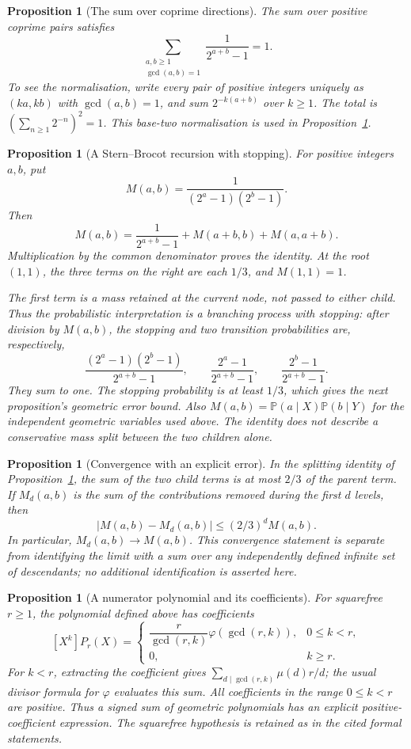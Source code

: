 \documentclass[11pt]{article}
\theoremstyle{plain}
\newtheorem{prop}[thm]{Proposition}
\theoremstyle{definition}
\theoremstyle{remark}
\begin{document}
\begin{prop}[The sum over coprime directions]\label{catalogue:mob:a8}
The sum over positive coprime pairs satisfies
\[
 \sum_{\substack{a,b\ge1\\\gcd(a,b)=1}}
                  \frac1{2^{a+b}-1}=1.
\]
To see the normalisation, write every pair of positive integers uniquely
as $(ka,kb)$ with $\gcd(a,b)=1$, and sum $2^{-k(a+b)}$ over $k\ge1$.
The total is $(\sum_{n\ge1}2^{-n})^2=1$. This base-two normalisation
is used in Proposition~\ref{catalogue:mob:a9a}.
\end{prop}

\begin{prop}[A Stern--Brocot recursion with stopping]\label{catalogue:mob:a9a}
For positive integers $a,b$, put
\[
 M(a,b)=\frac1{(2^a-1)(2^b-1)}.
\]
Then
\[
 M(a,b)=\frac1{2^{a+b}-1}+M(a+b,b)+M(a,a+b).
\]
Multiplication by the common denominator proves the identity. At the
root $(1,1)$, the three terms on the right are each $1/3$, and
$M(1,1)=1$.

The first term is a mass retained at the current node, not passed to
either child. Thus the probabilistic interpretation is a branching
process with stopping: after division by $M(a,b)$, the stopping and two
transition probabilities are, respectively,
\[
 \frac{(2^a-1)(2^b-1)}{2^{a+b}-1},\qquad
 \frac{2^a-1}{2^{a+b}-1},\qquad
 \frac{2^b-1}{2^{a+b}-1}.
\]
They sum to one. The stopping probability is at least $1/3$, which gives
the next proposition's geometric error bound. Also
$M(a,b)=\mathbb P(a\mid X)\mathbb P(b\mid Y)$ for the independent
geometric variables used above. The identity does not describe a
conservative mass split between the two children alone.
\end{prop}

\begin{prop}[Convergence with an explicit error]\label{catalogue:mob:a9b}
In the splitting identity of Proposition~\ref{catalogue:mob:a9a}, the
sum of the two child terms is at most $2/3$ of the parent term.
If $M_d(a,b)$ is the sum of the contributions removed during the first
$d$ levels, then
\[
 |M(a,b)-M_d(a,b)|\le(2/3)^d M(a,b).
\]
In particular, $M_d(a,b)\to M(a,b)$. This convergence statement is
separate from identifying the limit with a sum over any independently
defined infinite set of descendants; no additional identification is
asserted here.
\end{prop}

\begin{prop}[A numerator polynomial and its coefficients]\label{catalogue:mob:b1}
For squarefree $r\ge1$, the polynomial defined above has coefficients
\[
 [X^k]P_r(X)=
 \begin{cases}
 \dfrac r{\gcd(r,k)}\varphi(\gcd(r,k)),&0\le k<r,\\
 0,&k\ge r.
 \end{cases}
\]
For $k<r$, extracting the coefficient gives
$\sum_{d\mid\gcd(r,k)}\mu(d)r/d$; the usual divisor formula for
$\varphi$ evaluates this sum. All coefficients in the range $0\le k<r$
are positive. Thus a signed sum of geometric polynomials has an explicit
positive-coefficient expression. The squarefree hypothesis is retained
as in the cited formal statements.
\end{prop}
\end{document}
